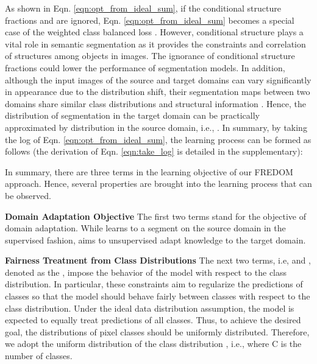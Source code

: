 \documentclass[10pt,twocolumn,letterpaper]{article}
\begin{document}
As shown in Eqn. \eqref{eqn:opt_from_ideal_sum}, if the conditional structure fractions  and  are ignored, Eqn. \eqref{eqn:opt_from_ideal_sum} becomes a special case of the weighted class balanced loss \cite{Cui_2019_CVPR, wang2021seesaw}. However, conditional structure plays a vital role in semantic segmentation as it provides the constraints and correlation of structures among objects in images. The ignorance of conditional structure fractions could lower the
performance of segmentation models.
In addition, although the input images of the source and target domains can vary significantly in appearance due to the distribution shift, their segmentation maps between two domains share similar class distributions and structural information \cite{tsai2018learning, tsai2019domain, truong2021bimal}. Hence, the distribution of segmentation in the target domain  can be practically approximated by distribution in the source domain, i.e., .
In summary, by taking the log of Eqn. \eqref{eqn:opt_from_ideal_sum}, the learning process can be formed as follows 
(the derivation of Eqn. \eqref{eqn:take_log} is detailed in the supplementary):
\vspace{-6mm}


In summary, there are three terms in the learning objective of our FREDOM approach. 
Hence, several properties are brought into the learning process that can be observed.

\noindent
\textbf{Domain Adaptation Objective} The first two terms stand for the objective of domain adaptation. While  learns to a segment on the source domain in the supervised fashion,  aims to unsupervised adapt knowledge to the target domain.


\noindent
\textbf{Fairness Treatment from Class Distributions} The next two terms, i.e,  and , denoted as the , impose the behavior of the model with respect to the class distribution. In particular, these constraints aim to regularize the predictions of classes so that the model should behave fairly between classes with respect to the class distribution. Under the ideal data distribution assumption, the model is expected to equally treat predictions of all classes. Thus, to achieve the desired goal, the distributions of pixel classes should be uniformly distributed. Therefore, we adopt the uniform distribution of the class distribution , i.e.,  where C is the number of classes.
\end{document}
